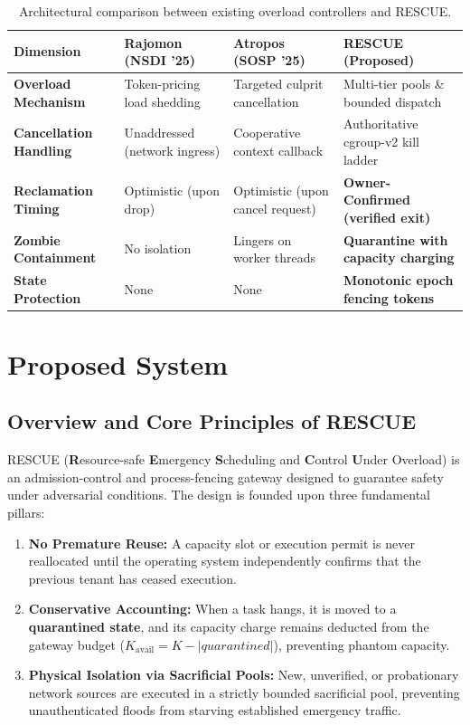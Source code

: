\documentclass[12pt,a4paper]{report}
\begin{document}
\begin{table}[H]
\centering
\small
\begin{tabularx}{\textwidth}{l X X X}
\toprule
\textbf{Dimension} & \textbf{Rajomon (NSDI '25)} & \textbf{Atropos (SOSP '25)} & \textbf{RESCUE (Proposed)} \\
\midrule
\textbf{Overload Mechanism} & Token-pricing load shedding & Targeted culprit cancellation & Multi-tier pools \& bounded dispatch \\
\textbf{Cancellation Handling} & Unaddressed (network ingress) & Cooperative context callback & Authoritative cgroup-v2 kill ladder \\
\textbf{Reclamation Timing} & Optimistic (upon drop) & Optimistic (upon cancel request) & \textbf{Owner-Confirmed (verified exit)} \\
\textbf{Zombie Containment} & No isolation & Lingers on worker threads & \textbf{Quarantine with capacity charging} \\
\textbf{State Protection} & None & None & \textbf{Monotonic epoch fencing tokens} \\
\bottomrule
\end{tabularx}
\caption{Architectural comparison between existing overload controllers and RESCUE.}
\label{tab:lit_comparison}
\end{table}

\chapter{Proposed System}

\section{Overview and Core Principles of RESCUE}
RESCUE (\textbf{R}esource-safe \textbf{E}mergency \textbf{S}cheduling and \textbf{C}ontrol \textbf{U}nder Overload) is an admission-control and process-fencing gateway designed to guarantee safety under adversarial conditions. The design is founded upon three fundamental pillars:
\begin{enumerate}
    \item \textbf{No Premature Reuse:} A capacity slot or execution permit is never reallocated until the operating system independently confirms that the previous tenant has ceased execution.
    \item \textbf{Conservative Accounting:} When a task hangs, it is moved to a \textbf{quarantined state}, and its capacity charge remains deducted from the gateway budget ($K_{\text{avail}} = K - |quarantined|$), preventing phantom capacity.
    \item \textbf{Physical Isolation via Sacrificial Pools:} New, unverified, or probationary network sources are executed in a strictly bounded sacrificial pool, preventing unauthenticated floods from starving established emergency traffic.
\end{enumerate}
\end{document}
